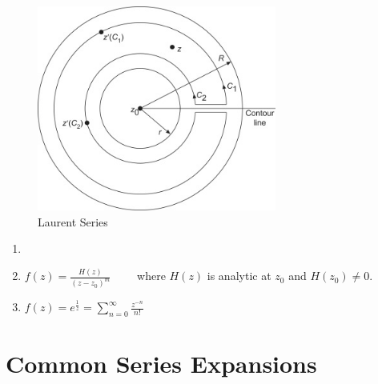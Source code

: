 \begin{figure}[h!]
    \centering
    \includegraphics[width=0.7\textwidth]{LECTURE_10/laurent-series.jpg}
    \caption{Laurent Series}
    \label{fig:laurent_series}
\end{figure}

\begin{example}
    \begin{enumerate}
        \item[]
        \item $f(z) = \frac{H(z)}{(z - z_0)^m} \qquad $ where $H(z)$ is analytic at $z_0$ and $H(z_0) \neq 0$.
        \item $f(z) = e^\frac{1}{z} = \sum_{n=0}^{\infty} \frac{z^{-n}}{n!}$
    \end{enumerate}
\end{example}

\section{Common Series Expansions}


